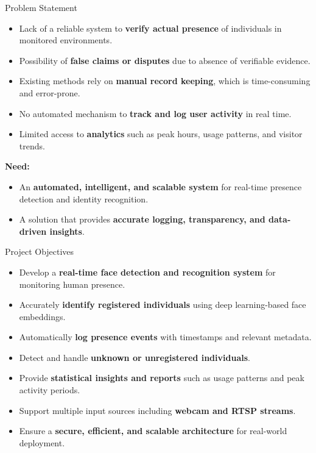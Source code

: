\documentclass[10pt]{beamer}
\begin{document}
\begin{frame}{Problem Statement}

\begin{itemize}
    \item Lack of a reliable system to \textbf{verify actual presence} of individuals in monitored environments.
    
    \item Possibility of \textbf{false claims or disputes} due to absence of verifiable evidence.
    
    \item Existing methods rely on \textbf{manual record keeping}, which is time-consuming and error-prone.
    
    \item No automated mechanism to \textbf{track and log user activity} in real time.
    
    \item Limited access to \textbf{analytics} such as peak hours, usage patterns, and visitor trends.
\end{itemize}

\vspace{0.3cm}

\textbf{Need:}
\begin{itemize}
    \item An \textbf{automated, intelligent, and scalable system} for real-time presence detection and identity recognition.
    
    \item A solution that provides \textbf{accurate logging, transparency, and data-driven insights}.
\end{itemize}

\end{frame}
\begin{frame}{Project Objectives}

\begin{itemize}
    \item Develop a \textbf{real-time face detection and recognition system} for monitoring human presence.
    
    \item Accurately \textbf{identify registered individuals} using deep learning-based face embeddings.
    
    \item Automatically \textbf{log presence events} with timestamps and relevant metadata.
    
    \item Detect and handle \textbf{unknown or unregistered individuals}.
    
    \item Provide \textbf{statistical insights and reports} such as usage patterns and peak activity periods.
    
    \item Support multiple input sources including \textbf{webcam and RTSP streams}.
    
    \item Ensure a \textbf{secure, efficient, and scalable architecture} for real-world deployment.
\end{itemize}

\end{frame}
\end{document}
